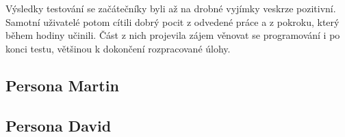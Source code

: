 Výsledky testování se začátečníky byli až na drobné vyjímky veskrze pozitivní. Samotní uživatelé potom cítili dobrý pocit z odvedené práce a z pokroku, který během hodiny učinili. Část z nich projevila zájem věnovat se programování i po konci testu, většinou k dokončení rozpracované úlohy.

\subsection{Persona Martin}

\blind[2]

\subsection{Persona David}

\blind[1]

